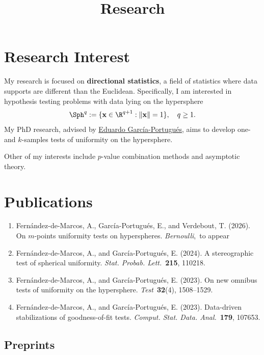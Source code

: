 \title{Research}

\section*{Research Interest}

My research is focused on \textbf{directional statistics}, a field of statistics where data supports are different than the Euclidean. Specifically, I am interested in hypothesis testing problems with data lying on the hypersphere
\[
  \Sph^q:=\{\mathbf{x}\in \R^{q+1}:\|\mathbf{x}\|= 1\},\quad q\geq 1.
\]
My PhD research, advised by \href{https://egarpor.github.io/}{Eduardo García-Portugués}, aims to develop one- and $k$-samples tests of uniformity on the hypersphere.

Other of my interests include $p$-value combination methods and asymptotic theory.

\section*{Publications}

\begin{enumerate}
  \item Fernández-de-Marcos, A., García-Portugués, E., and Verdebout, T. (2026). On $m$-points uniformity tests on hyperspheres. \emph{Bernoulli},~to appear 
  \item Fernández-de-Marcos, A., and García-Portugués, E. (2024). A stereographic test of spherical uniformity. \emph{Stat. Probab. Lett.}~\textbf{215}, 110218.  
  \item Fernández-de-Marcos, A., and García-Portugués, E. (2023). On new omnibus tests of uniformity on the hypersphere. \emph{Test}~\textbf{32}(4), 1508--1529.  
  \item Fernández-de-Marcos, A., and García-Portugués, E. (2023). Data-driven stabilizations of goodness-of-fit tests. \emph{Comput. Stat. Data. Anal.}~\textbf{179}, 107653.  
\end{enumerate}

\subsection*{Preprints}

